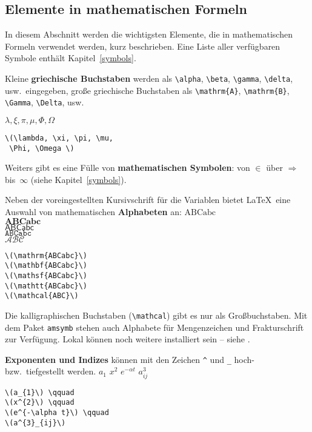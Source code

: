 \subsection{Elemente in mathematischen Formeln}
 
In diesem Abschnitt werden die wichtigsten Elemente, die in
mathematischen Formeln verwendet werden, kurz beschrieben.  Eine
Liste aller verfügbaren Symbole enthält
Kapitel~\ref{symbols}.
 
\bigskip

\begin{sloppypar} 
\relax %
Kleine \textbf{griechische Buchstaben} werden als \verb|\alpha|,
\verb|\beta|, \verb|\gamma|, \verb|\delta|, usw.\ eingegeben,
große griechische Buchstaben als \verb|\mathrm{A}|,
\verb|\mathrm{B}|, \verb|\Gamma|, \verb|\Delta|, usw.
\end{sloppypar}
\exa
\(\lambda, \xi, \pi, \mu,
 \Phi, \Omega \)
\exb
\begin{verbatim}
\(\lambda, \xi, \pi, \mu,
 \Phi, \Omega \)
\end{verbatim}
\exc
 
Weiters gibt es eine Fülle von \textbf{mathematischen Symbolen}:
von \(\in\) über \(\Rightarrow\) bis~\(\infty\) (siehe
Kapitel~\ref{symbols}).
 
\bigskip

Neben der voreingestellten Kursivschrift für die Variablen
bietet \LaTeX\ eine Auswahl von mathematischen \textbf{Alphabeten} an:
\exa
\(\mathrm{ABCabc}\) \\
\(\mathbf{ABCabc}\) \\
\(\mathsf{ABCabc}\) \\
\(\mathtt{ABCabc}\) \\
\(\mathcal{ABC}\)
\exb
\begin{verbatim}
\(\mathrm{ABCabc}\)
\(\mathbf{ABCabc}\)
\(\mathsf{ABCabc}\)
\(\mathtt{ABCabc}\)
\(\mathcal{ABC}\)
\end{verbatim}
\exc
Die kalligraphischen Buchstaben (\verb:\mathcal:) gibt es nur als
Großbuchstaben. Mit dem Paket \texttt{amsymb} \cite{ch8} stehen
auch Alphabete für Mengenzeichen und Frakturschrift zur Verfügung.
Lokal können noch weitere installiert sein -- siehe \local.


\bigskip

\textbf{Exponenten und Indizes} können mit den Zeichen \verb|^|
und \verb|_| hoch- bzw.\ tiefgestellt werden.
\exa
\(a_{1}\) \qquad
\(x^{2}\) \qquad
\(e^{-\alpha t}\) \qquad
\(a^{3}_{ij}\)
\exb
\begin{verbatim}
\(a_{1}\) \qquad
\(x^{2}\) \qquad
\(e^{-\alpha t}\) \qquad
\(a^{3}_{ij}\)
\end{verbatim}
\exc
 
